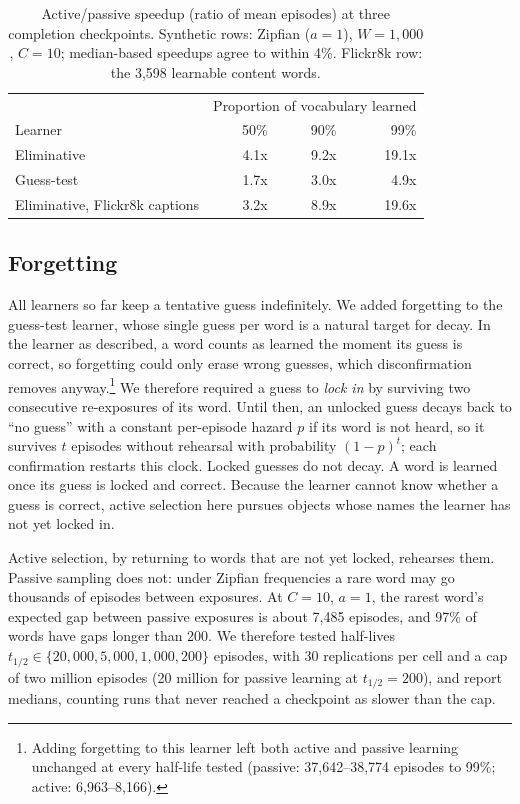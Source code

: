 \documentclass[a4paper,natbib,man]{apa6}
\begin{document}
\begin{table}[h]
\centering
\caption{\label{tab-checkpoint} Active/passive speedup (ratio of mean episodes) at three completion checkpoints. Synthetic rows: Zipfian ($a=1$), $W=1{,}000$, $C=10$; median-based speedups agree to within 4\%. Flickr8k row: the 3,598 learnable content words.}
\begin{tabular}{lrrr}
\hline
 & \multicolumn{3}{c}{Proportion of vocabulary learned} \\
Learner & 50\% & 90\% & 99\% \\
\hline
Eliminative  & 4.1x & 9.2x & 19.1x \\
Guess-test   & 1.7x & 3.0x & 4.9x  \\
Eliminative, Flickr8k captions & 3.2x & 8.9x & 19.6x \\
\hline
\end{tabular}
\end{table}

\subsection{Forgetting}
\label{sec-decay}
All learners so far keep a tentative guess indefinitely. We added forgetting to the guess-test learner, whose single guess per word is a natural target for decay. In the learner as described, a word counts as learned the moment its guess is correct, so forgetting could only erase wrong guesses, which disconfirmation removes anyway.\footnote{Adding forgetting to this learner left both active and passive learning unchanged at every half-life tested (passive: 37,642--38,774 episodes to 99\%; active: 6,963--8,166).} We therefore required a guess to \textit{lock in} by surviving two consecutive re-exposures of its word. Until then, an unlocked guess decays back to ``no guess'' with a constant per-episode hazard $p$ if its word is not heard, so it survives $t$ episodes without rehearsal with probability $(1-p)^t$; each confirmation restarts this clock. Locked guesses do not decay. A word is learned once its guess is locked and correct. Because the learner cannot know whether a guess is correct, active selection here pursues objects whose names the learner has not yet locked in.

Active selection, by returning to words that are not yet locked, rehearses them. Passive sampling does not: under Zipfian frequencies a rare word may go thousands of episodes between exposures. At $C=10$, $a=1$, the rarest word's expected gap between passive exposures is about 7,485 episodes, and 97\% of words have gaps longer than 200. We therefore tested half-lives $t_{1/2} \in \{20{,}000, 5{,}000, 1{,}000, 200\}$ episodes, with 30 replications per cell and a cap of two million episodes (20 million for passive learning at $t_{1/2}=200$), and report medians, counting runs that never reached a checkpoint as slower than the cap.
\end{document}
